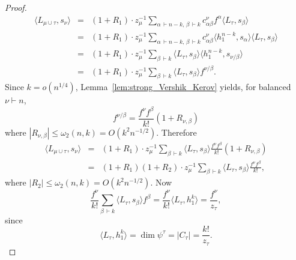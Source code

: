 \documentclass[12pt]%
{amsart}
\newcommand{\al}{{\alpha}}
\newcommand{\om}{{\omega}}
\theoremstyle{plain}
\theoremstyle{definition}
\theoremstyle{remark}
\begin{document}
\begin{proof}
\begin{eqnarray*}
    \langle L_{\mu\cup\tau},s_\nu \rangle
    &=& (1 + R_1) \cdot z_\mu^{-1} \sum_{\al \,\vdash n-k,\,\beta \,\vdash k} c^\nu_{\al\beta}f^\al\langle L_\tau,s_{\beta} \rangle \nonumber \\
    &=& (1 + R_1) \cdot z_\mu^{-1} \sum_{\al \,\vdash n-k,\,\beta \,\vdash k} c^\nu_{\al\beta}\langle h_1^{n-k},s_\al \rangle \langle L_\tau,s_{\beta} \rangle \nonumber \\
    &=& (1 + R_1) \cdot z_\mu^{-1} \sum_{\beta\,\vdash k} \langle L_\tau,s_\beta \rangle \langle h_1^{n-k},s_{\nu/\beta} \rangle \\
    &=& (1 + R_1) \cdot z_\mu^{-1} \sum_{\beta\,\vdash k} \langle L_\tau,s_\beta \rangle f^{\nu/\beta}.
\end{eqnarray*}
Since $k = o(n^{1/4})$, Lemma~\ref{lem:strong_Vershik_Kerov} yields, for balanced $\nu \vdash n$,
\begin{equation*}%
    f^{\nu/\beta} 
    = \frac{f^\nu f^\beta}{k!} (1 + R_{\nu,\beta})    
\end{equation*}
where $|R_{\nu,\beta}| \le \om_2(n,k) = O(k^2n^{-1/2})$.
Therefore
\begin{eqnarray*}
    \langle L_{\mu\cup\tau},s_\nu \rangle
    &=& (1 + R_1) \cdot z_\mu^{-1} \sum_{\beta\,\vdash k} \langle L_\tau,s_\beta \rangle \frac{f^\nu f^\beta}{k!} (1 + R_{\nu,\beta}) \\
    &=& (1 + R_1) (1 + R_2) \cdot z_\mu^{-1} \sum_{\beta\,\vdash k} \langle L_\tau,s_\beta \rangle \frac{f^\nu f^\beta}{k!} ,
\end{eqnarray*}
where $|R_2| \le \om_2(n,k) = O(k^2n^{-1/2})$.
Now 
\begin{equation*}%
    \frac{f^\nu}{k!} \sum_{\beta\,\vdash k} \langle L_\tau,s_\beta \rangle f^\beta
    = \frac{f^\nu}{k!} \langle L_{\tau},h_1^k \rangle
    = \frac{f^\nu}{z_\tau},
\end{equation*}
since 
\[
    \langle L_{\tau},h_1^k\rangle=\dim\psi^\tau=|C_\tau|=\frac{k!}{z_\tau}.
\]

\end{proof}
\end{document}
